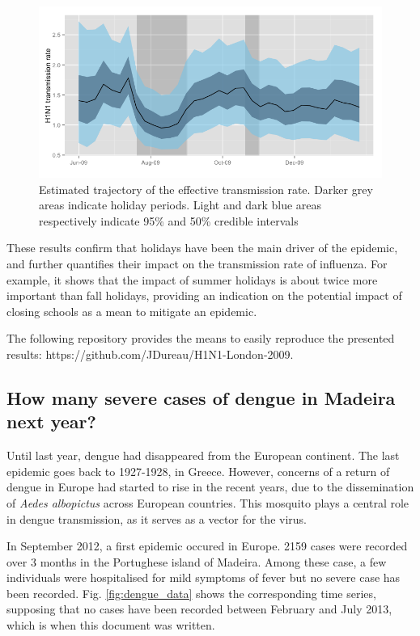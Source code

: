 \documentclass[a4paper,11pt,titlepage]{article}
\theoremstyle{plain} %
\begin{document}
\begin{figure}[h]
\begin{centering}
\includegraphics[scale=0.5]{H1N1_beta.png}
\par\end{centering}
\caption{\label{fig:H1N1_beta}Estimated trajectory of the effective transmission rate. Darker grey areas indicate holiday periods. Light and dark blue areas respectively indicate 95\% and 50\% credible intervals}
\end{figure}

These results confirm that holidays have been the main driver of the epidemic, and further quantifies their impact on the transmission rate of influenza. For example, it shows that the impact of summer holidays is about twice more important than fall holidays, providing an indication on the potential impact of closing schools as a mean to mitigate an epidemic.

The following repository provides the means to easily reproduce the presented results: https://github.com/JDureau/H1N1-London-2009.


\subsection{How many severe cases of dengue in Madeira next year?}

Until last year, dengue had disappeared from the European continent. The last epidemic goes back to 1927-1928, 
in Greece. However, concerns of a return of dengue in Europe had started to rise in the recent years, due to the dissemination 
of \emph{Aedes albopictus} across European countries. This mosquito plays a central role in dengue transmission, as it serves as a vector for the  virus. 


In September 2012, a first epidemic occured in Europe. 2159 cases were recorded over 3 months in the Portughese 
island of Madeira. Among these case, a few individuals were hospitalised for mild symptoms of fever but no severe case
has been recorded. Fig. \ref{fig:dengue_data} shows the corresponding time series, supposing that no cases have been recorded between February and July 2013, which is when this document was written.
\end{document}
